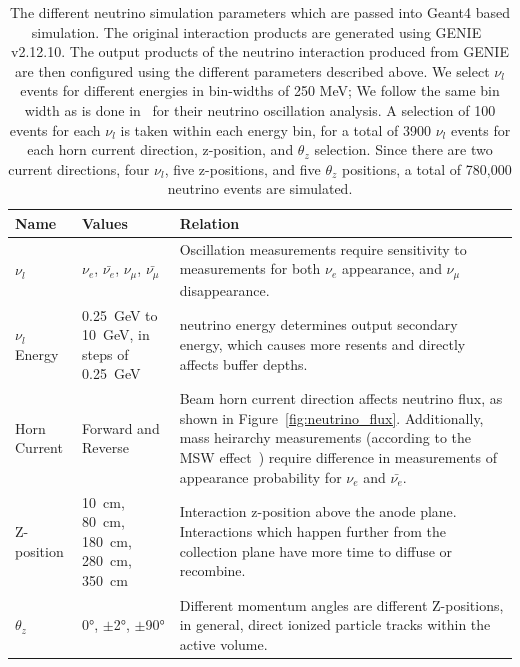 \begin{table}
\begin{center}
\begin{tabular}{|| p{30mm} | p{30mm} | p{90mm} ||}
 \hline
 Name & Values & Relation \\ [0.5ex]
 \hline\hline
  $\nu_{l}$ & $\nu_{e}$, $\bar{\nu_{e}}$, $\nu_{\mu}$, $\bar{\nu_{\mu}}$ & Oscillation measurements require sensitivity to measurements for both $\nu_{e}$ appearance, and $\nu_{\mu}$ disappearance.\\
 \hline
  $\nu_{l}$ Energy & 0.25~\unit{GeV} to 10~\unit{GeV}, in steps of 0.25~\unit{GeV} & neutrino energy determines output secondary energy, which causes more resents and directly affects buffer depths. \\
 \hline
  Horn Current & Forward and Reverse & Beam horn current direction affects neutrino flux, as shown in Figure~\ref{fig:neutrino_flux}. Additionally, mass heirarchy measurements (according to the MSW effect~\citep{Smirnov2004TheME}) require difference in measurements of appearance probability for $\nu_{e}$ and $\bar{\nu_{e}}$. \\
 \hline
  Z-position & 10~\unit{cm}, 80~\unit{cm}, 180~\unit{cm}, 280~\unit{cm}, 350~\unit{cm}  & Interaction z-position above the anode plane. Interactions which happen further from the collection plane have more time to diffuse or recombine. \\
 \hline
  $\theta_{z} $ & 0\unit{\degree}, $\pm$2\unit{\degree}, $\pm$90\unit{\degree} & Different momentum angles are different Z-positions, in general, direct ionized particle tracks within the active volume. \\
 \hline
\end{tabular}
\caption{The different neutrino simulation parameters which are passed into Geant4 based simulation.
  The original interaction products are generated using GENIE~\citep{Andreopoulos:2009rq} v2.12.10.
  The output products of the neutrino interaction produced from GENIE are then configured using the different parameters described above.
  We select $\nu_{l}$ events for different energies in bin-widths of 250 MeV; We follow the same bin width as is done in~\citep{DUNE_FD_TDRv2_2020} for their neutrino oscillation analysis.
  A selection of 100 events for each $\nu_{l}$ is taken within each energy bin, for a total of 3900 $\nu_{l}$ events for each horn current direction, z-position, and $\theta_{z}$ selection.
  Since there are two current directions, four $\nu_{l}$, five z-positions, and five $\theta_{z}$ positions, a total of 780,000 neutrino events are simulated.
}
\end{center}
\end{table}
~\label{table:neutrino_params}

